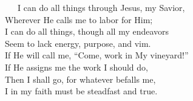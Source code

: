 \documentclass[
]{book}
\begin{document}
~~~I can do all things through Jesus, my Savior,\\
\hspace*{0.333em}\hspace*{0.333em}\hspace*{0.333em}Wherever He calls me to labor for Him;\\
\hspace*{0.333em}\hspace*{0.333em}\hspace*{0.333em}I can do all things, though all my endeavors\\
\hspace*{0.333em}\hspace*{0.333em}\hspace*{0.333em}Seem to lack energy, purpose, and vim.\\
\hspace*{0.333em}\hspace*{0.333em}\hspace*{0.333em}If He will call me, ``Come, work in My vineyard!''\\
\hspace*{0.333em}\hspace*{0.333em}\hspace*{0.333em}If He assigns me the work I should do,\\
\hspace*{0.333em}\hspace*{0.333em}\hspace*{0.333em}Then I shall go, for whatever befalls me,\\
\hspace*{0.333em}\hspace*{0.333em}\hspace*{0.333em}I in my faith must be steadfast and true.
\end{document}
